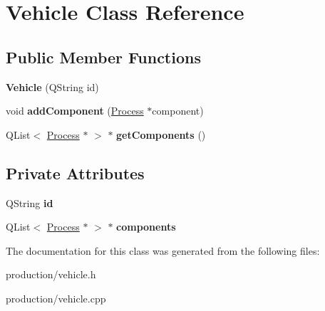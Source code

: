 \hypertarget{classVehicle}{}\section{Vehicle Class Reference}
\label{classVehicle}
\subsection*{Public Member Functions}
\begin{DoxyCompactItemize}
\item 
\mbox{\label{classVehicle_aafbc4c3c6b79003e52b06b80e5e45cdd}} 
{\bfseries Vehicle} (Q\+String id)
\item 
\mbox{\label{classVehicle_a7e92251ee0b6910205b797c7620612bc}} 
void {\bfseries add\+Component} (\hyperlink{classProcess}{Process} $\ast$component)
\item 
\mbox{\label{classVehicle_a4d4339ee290af95c7fa0492fdfb04669}} 
Q\+List$<$ \hyperlink{classProcess}{Process} $\ast$ $>$ $\ast$ {\bfseries get\+Components} ()
\end{DoxyCompactItemize}
\subsection*{Private Attributes}
\begin{DoxyCompactItemize}
\item 
\mbox{\label{classVehicle_ab6f012a9d9ab25bdd19c47ebf1a4ab06}} 
Q\+String {\bfseries id}
\item 
\mbox{\label{classVehicle_af6fc37f2e81ecc9c9e122ac773fe3ca0}} 
Q\+List$<$ \hyperlink{classProcess}{Process} $\ast$ $>$ $\ast$ {\bfseries components}
\end{DoxyCompactItemize}


The documentation for this class was generated from the following files\+:\begin{DoxyCompactItemize}
\item 
production/vehicle.\+h\item 
production/vehicle.\+cpp\end{DoxyCompactItemize}
